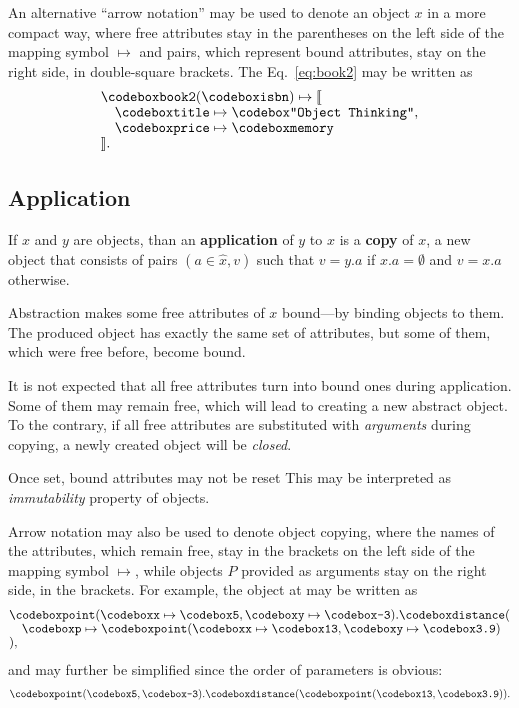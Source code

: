 An alternative ``arrow notation'' may be used to denote an object $x$ in a more
compact way, where free attributes stay in the parentheses on the left side of the
mapping symbol $\mapsto$ and pairs,
which represent bound attributes, stay on the right side, in double-square brackets.
The Eq.~\ref{eq:book2} may be written as
\begin{equation}\label{eq:book2-compact}
\begin{split}
& \f{book2}(\f{isbn}) \mapsto \llbracket \br
& \quad \f{title} \mapsto \f{"Object Thinking"}, \br
& \quad \f{price} \mapsto \f{memory} \br
& \rrbracket. \\
\end{split}
\end{equation}

\subsection{Application}

\begin{eodefinition}\label{def:application}
If $x$ and $y$ are objects, than an \textbf{application} of $y$ to $x$ is
  a \textbf{copy} of $x$, a new object that consists of pairs $(a\in\hat{x},v)$ such that
  $v=y.a$ if $x.a=\emptyset$ and $v=x.a$ otherwise.
\end{eodefinition}

Abstraction makes some free attributes of $x$ bound---by binding objects to them.
The produced object has exactly the same set of attributes, but some of them,
which were free before, become bound.

It is not expected that all free attributes turn into bound ones during application.
Some of them may remain free, which will lead
to creating a new abstract object. To the contrary,
if all free attributes are substituted with \emph{arguments} during copying,
a newly created object will be \emph{closed}.

Once set, bound attributes may not be reset
This may be interpreted as \emph{immutability} property of objects.

Arrow notation may also be used to denote object copying,
where the names of the attributes, which remain free, stay in the brackets
on the left side of the mapping symbol $\mapsto$,
while objects $P$ provided as arguments stay on the right side,
in the brackets. For example, the object at  may be written as
\begin{equation}\label{eq:point}
\begin{split}
& \f{point}(\f{x} \mapsto \f{5}, \f{y} \mapsto \f{-3}).\f{distance}(\br
& \quad \f{p} \mapsto \f{point}(\f{x} \mapsto \f{13}, \f{y} \mapsto \f{3.9}) \br
& ),
\end{split}
\end{equation}
and may further be simplified since the order of parameters is obvious:
\begin{equation}
\begin{split}
\f{point}(\f{5}, \f{-3}).\f{distance}(\f{point}(\f{13}, \f{3.9})).
\end{split}
\end{equation}

